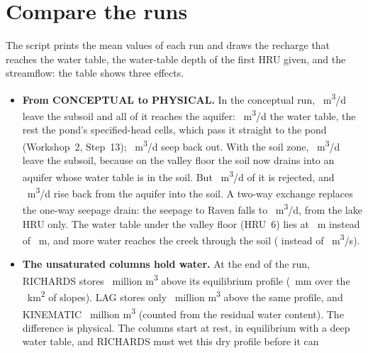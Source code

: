 \section{Compare the runs}

The script  prints the mean values of each run and draws the recharge that reaches the water table,
the water-table depth of the first HRU given, and the streamflow:
\why the table shows three effects.
\begin{itemize}
\item \textbf{From CONCEPTUAL to PHYSICAL.} In the conceptual run, ~m\textsuperscript{3}/d leave
  the subsoil and all of it reaches the aquifer: ~m\textsuperscript{3}/d the water table, the rest
  the pond's specified-head cells, which pass it straight to the pond (Workshop~2, Step~13);
  ~m\textsuperscript{3}/d seep back out. With the soil
  zone, ~m\textsuperscript{3}/d leave the subsoil, because on the valley floor the soil now drains
  into an aquifer whose water table is in the soil. But ~m\textsuperscript{3}/d of it is
  rejected, and ~m\textsuperscript{3}/d rise back from the aquifer into the soil. A two-way exchange
  replaces the one-way seepage drain: the seepage to Raven falls to ~m\textsuperscript{3}/d, from the
  lake HRU only. The water table under the valley floor (HRU~6) lies at ~m instead of
  ~m, and more water reaches the creek through the soil ( instead of
  ~m\textsuperscript{3}/s).
\item \textbf{The unsaturated columns hold water.} At the end of the run, RICHARDS stores ~million
  m\textsuperscript{3} above its equilibrium profile (~mm over the ~km\textsuperscript{2} of
  slopes). LAG stores only ~million m\textsuperscript{3} above the same profile, and KINEMATIC
  ~million m\textsuperscript{3} (counted from the residual water content). The difference is physical.
  The columns start at rest, in equilibrium with a deep water table, and RICHARDS must wet this dry profile before it can

\end{itemize}
